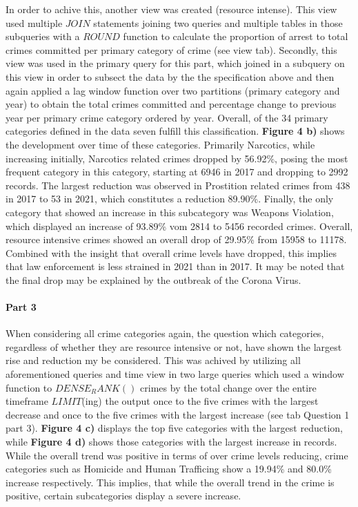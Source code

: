 \documentclass[a4paper]{article}
\begin{document}
In order to achive this, another view was created (resource intense). This view used multiple $JOIN$ statements joining two queries and multiple tables in those subqueries with a $ROUND$ function to calculate the proportion of arrest to total crimes committed per primary category of crime (see view tab). Secondly, this view was used in the primary query for this part, which joined in a subquery on this view in order to subsect the data by the the specification above and then again applied a lag window function over two partitions (primary category and year) to obtain the total crimes committed and percentage change to previous year per primary crime category ordered by year. Overall, of the 34 primary categories defined in the data seven fulfill this classification. \textbf{Figure 4 b)} shows the development over time of these categories. Primarily Narcotics, while increasing initially, Narcotics related crimes dropped by 56.92\%, posing the most frequent category in this category, starting at 6946 in 2017 and dropping to 2992 records. The largest reduction was observed in Prostition related crimes from 438 in 2017 to 53 in 2021, which constitutes a reduction 89.90\%. Finally, the only category that showed an increase in this subcategory was Weapons Violation, which displayed an increase of 93.89\% vom 2814 to 5456 recorded crimes. Overall, resource intensive crimes showed an overall drop of 29.95\% from 15958 to 11178. Combined with the insight that overall crime levels have dropped, this implies that law enforcement is less strained in 2021 than in 2017. It may be noted that the final drop may be explained by the outbreak of the Corona Virus.

\paragraph{Part 3} When considering all crime categories again, the question which categories, regardless of whether they are resource intensive or not, have shown the largest rise and reduction my be considered. This was achived by utilizing all aforementioned queries and time view in two large queries which used a window function to $DENSE_RANK()$ crimes by the total change over the entire timeframe $LIMIT$(ing) the output once to the five crimes with the largest decrease and once to the five crimes with the largest increase (see tab Question 1 part 3). \textbf{Figure 4 c)} displays the top five categories with the largest reduction, while \textbf{Figure 4 d)} shows those categories with the largest increase in records. While the overall trend was positive in terms of over crime levels reducing, crime categories such as Homicide and Human Trafficing show a 19.94\% and 80.0\% increase respectively. This implies, that while the overall trend in the crime is positive, certain subcategories display a severe increase.  
\end{document}
